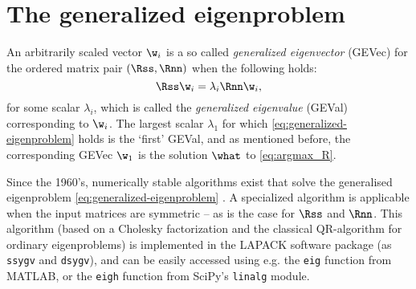 \section{The generalized eigenproblem}
\label{sec:generalized-eigenproblem}

An arbitrarily scaled vector $\w_i$ is a so called \emph{generalized eigenvector} (GEVec) for the ordered matrix pair $(\Rss, \Rnn)$ when the following holds:
%
\begin{equation}
\label{eq:generalized-eigenproblem}
\Rss \w_i = \lambda_i \Rnn \w_i,
\end{equation}
%
for some scalar $\lambda_i$, which is called the \emph{generalized eigenvalue} (GEVal) corresponding to $\w_i$. The largest scalar $\lambda_1$ for which \cref{eq:generalized-eigenproblem} holds is the `first' GEVal, and as mentioned before, the corresponding GEVec $\w_1$ is the solution $\what$ to \cref{eq:argmax_R}.

Since the 1960's, numerically stable algorithms exist that solve the generalised eigenproblem \cref{eq:generalized-eigenproblem} \cite{Golub2013}. A specialized algorithm is applicable when the input matrices are symmetric -- as is the case for $\Rss$ and $\Rnn$. This algorithm (based on a Cholesky factorization and the classical QR-algorithm for ordinary eigenproblems) is implemented in the LAPACK software package (as \texttt{ssygv} and \texttt{dsygv}), and can be easily accessed using e.g. the \texttt{eig} function from MATLAB, or the \texttt{eigh} function from SciPy's \texttt{linalg} module.
